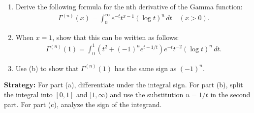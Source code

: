\begin{problembox}
\begin{problemstatement}
\begin{enumerate}[label=(\alph*)]
\item Derive the following formula for the nth derivative of the Gamma function:
\begin{align*}
\Gamma^{(n)}(x) = \int_{0}^{\infty} e^{-t} t^{x-1} (\log t)^{n} \, dt \quad (x > 0).
\end{align*}
\item When $x = 1$, show that this can be written as follows:
\begin{align*}
\Gamma^{(n)}(1) = \int_{0}^{1} (t^{2} + (-1)^{n} e^{t-1/t}) e^{-t} t^{-2} (\log t)^{n} \, dt.
\end{align*}
\item Use (b) to show that $\Gamma^{(n)}(1)$ has the same sign as $(-1)^{n}$.
\end{enumerate}
\end{problemstatement}
\end{problembox}

\noindent\textbf{Strategy:} For part (a), differentiate under the integral sign. For part (b), split the integral into $[0,1]$ and $[1,\infty)$ and use the substitution $u = 1/t$ in the second part. For part (c), analyze the sign of the integrand.

